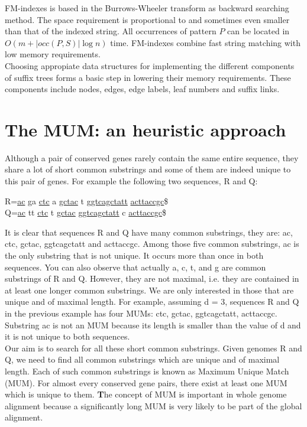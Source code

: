 \documentclass[runningheads,a4paper]{llncs}
\begin{document}
{FM-indexes \cite{fm} is based in the Burrows-Wheeler transform \cite{bwt} as backward searching method. The space requirement is proportional to and sometimes even smaller than that of the indexed string. All occurrences of pattern $P$ can be located in $O(m+|occ(P,S)|\log n)$ time. FM-indexes combine fast string matching with low memory requirements.\\
Choosing appropiate data structures for implementing the different components of suffix trees forms a basic step in lowering their memory requirements. These components include nodes, edges, edge labels, leaf numbers and suffix links.
\section{The MUM: an heuristic approach}
Although a pair of conserved genes rarely contain the same entire sequence, they share a lot of short common substrings and some of them are indeed unique to this pair of genes. For example the following two sequences, R and Q:\\
\begin{center}
    R=\underline{ac} ga \underline{ctc} a \underline{gctac} t \underline{ggtcagctatt} \underline{acttaccgc}\$\\
      Q=\underline{ac} tt \underline{ctc} t \underline{gctac} \underline{ggtcagctatt} c \underline{acttaccgc}\$\\
\end{center}
It is clear that sequences R and Q have many common substrings, they are: ac, ctc, gctac, ggtcagctatt and acttaccgc. Among those five common substrings, ac is the only substring that is not unique. It occurs more than once in both sequences. You can also observe that actually a, c, t, and g are common substrings of R and Q. However, they are not maximal, i.e. they are contained in at least one longer common substrings. We are only interested in those that are unique and of maximal length. For example, assuming d = 3, sequences R and Q in the previous example has four MUMs: ctc, gctac, ggtcagctatt, acttaccgc. Substring ac is not an MUM because its length is smaller than the value of d and it is not unique to both sequences.\\
Our aim is to search for all these short common substrings. Given genomes R and Q, we need to find all common substrings which are unique and of maximal length. Each of such common substrings is known as Maximum Unique Match (MUM). For almost every conserved gene pairs, there exist at least one MUM which is unique to them. {\textbf The concept of MUM is important in whole genome alignment because a significantly long MUM is very likely to be part of the global alignment.}
}
\end{document}
